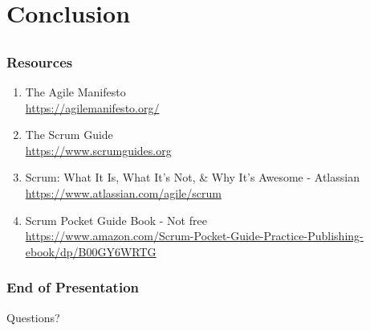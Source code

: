 \section{Conclusion}
\subsection{}

\begin{frame}
	\frametitle{Resources}
	\begin{enumerate}
		\setlength\itemsep{0.7em}
		\item The Agile Manifesto \\
		\url{https://agilemanifesto.org/}
		\item The Scrum Guide \\
		\url{https://www.scrumguides.org}
		\item Scrum: What It Is, What It's Not, \& Why It's Awesome - Atlassian\\
		\url{https://www.atlassian.com/agile/scrum}
		\item Scrum Pocket Guide Book - Not free \\
		\url{https://www.amazon.com/Scrum-Pocket-Guide-Practice-Publishing-ebook/dp/B00GY6WRTG}
	\end{enumerate}
\end{frame}

\begin{frame}
	\frametitle{End of Presentation}
	Questions?
\end{frame}

